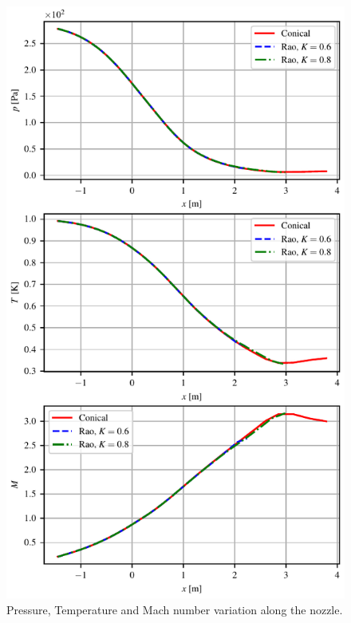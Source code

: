 \documentclass{article}
\begin{document}




\begin{figure}[htb]
    \centering
    \includegraphics[scale=1]{../plots/pTM_vs_x.pdf}
    \caption{Pressure, Temperature and Mach number variation along the nozzle.}
\end{figure}
\end{document}
